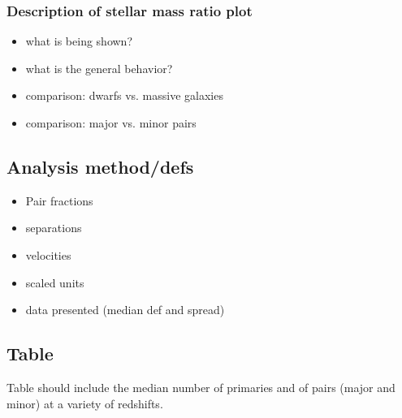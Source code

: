 \documentclass[twocolumn]{aastex631}
\begin{document}
    \subsubsection{Description of stellar mass ratio plot}
            \begin{itemize}
                \item what is being shown?
                \item what is the general behavior?
                \item comparison: dwarfs vs. massive galaxies 
                \item comparison: major vs. minor pairs
            \end{itemize}
    
\subsection{Analysis method/defs} \label{sec:methods-analysis}
    \begin{itemize}
        \item Pair fractions
        \item separations
        \item velocities
        \item scaled units
        \item data presented (median def and spread)
    \end{itemize}

\subsection{Table}
Table should include the median number of primaries and of pairs (major and minor) at a variety of redshifts. 



\end{document}
